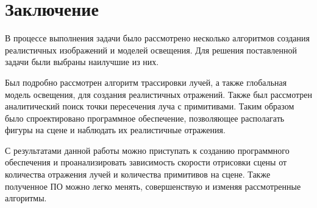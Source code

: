 \chapter{Заключение}
В процессе выполнения задачи было рассмотрено несколько алгоритмов создания реалистичных изображений и моделей освещения. Для решения поставленной
задачи были выбраны наилучшие из них.

Был подробно рассмотрен алгоритм трассировки лучей, а также глобальная модель освещения, для создания реалистичных отражений. Также был рассмотрен
аналитический поиск точки пересечения луча с примитивами. Таким образом было спроектировано программное  обеспечение, позволяющее располагать фигуры на сцене и
наблюдать их  реалистичные отражения.

С результатами данной работы можно приступать к созданию программного обеспечения и проанализировать зависимость скорости отрисовки сцены от 
количества отражения лучей и количества примитивов на сцене. Также полученное ПО можно легко менять, совершенствую и изменяя рассмотренные алгоритмы.